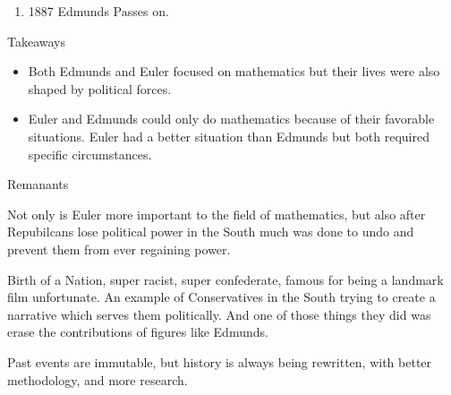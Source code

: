 \documentclass{report}
\begin{document}
\begin{description}
\begin{mdframed}
\begin{enumerate}
                \item 1887 Edmunds Passes on.
            \end{enumerate}
        \end{mdframed}
    \item {\large Takeaways}
        \begin{itemize}
            \item Both Edmunds and Euler focused on mathematics
                but their lives were also shaped by political
                forces.
            \item Euler and Edmunds could only do mathematics
                because of their favorable situations. 
                Euler had a better situation than Edmunds
                but both required specific circumstances.
        \end{itemize}
    \item {\large Remanants}
        \begin{mdframed}
            Not only is Euler more important to the field
            of mathematics, but also after Repubilcans
            lose political power in the South much was done
            to undo and prevent them from ever regaining power.
        \end{mdframed}
        \begin{mdframed}
            Birth of a Nation, super racist, super confederate,
            famous for being a landmark film unfortunate.
            An example of Conservatives in the South trying
            to create a narrative which serves them politically.
            And one of those things they did was erase the
            contributions of figures like Edmunds.
        \end{mdframed}
        \begin{mdframed}
            Past events are immutable, but history is always
            being rewritten, with better methodology, and more
            research.
        \end{mdframed}


\end{description}
\end{document}

